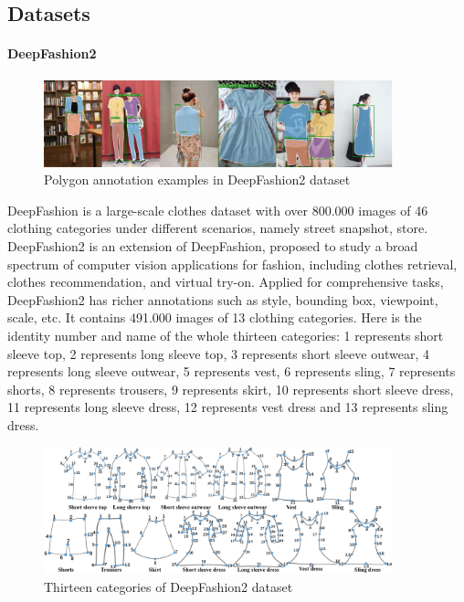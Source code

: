 \subsection{Datasets} \label{sec:dataset}

\paragraph{DeepFashion2}

\begin{figure} [H]
    \centering
    \captionsetup{justification=centering}
    \includegraphics[width=0.9\textwidth]{chapter4/image/deepfashion20.jpg}
    \caption{Polygon annotation examples in DeepFashion2 dataset}
    \label{fig:df}
\end{figure}

DeepFashion is a large-scale clothes dataset with over 800.000 images of 46 clothing categories under different scenarios, namely street snapshot, store. DeepFashion2 is an extension of DeepFashion, proposed to study a broad spectrum of computer vision applications for fashion, including clothes retrieval, clothes recommendation, and virtual try-on. Applied for comprehensive tasks, DeepFashion2 has richer annotations such as style, bounding box, viewpoint, scale, etc. It contains 491.000 images of 13 clothing categories. Here is the identity number and name of the whole thirteen categories: 1 represents short sleeve top, 2 represents long sleeve top, 3 represents short sleeve outwear, 4 represents long sleeve outwear, 5 represents vest, 6 represents sling, 7 represents shorts, 8 represents trousers, 9 represents skirt, 10 represents short sleeve dress, 11 represents long sleeve dress, 12 represents vest dress and 13 represents sling dress. \par 

\begin{figure} [H]
    \centering
    \captionsetup{justification=centering}
    \includegraphics[width=0.9\textwidth]{chapter4/image/deepfahsion2_class.jpg}
    \caption{Thirteen categories of DeepFashion2 dataset}
    \label{fig:dfcate}
\end{figure}

